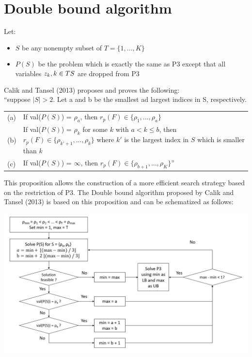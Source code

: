 \section{Double bound algorithm}

Let:
\begin{itemize}
	\item $S$ be any nonempty subset of $T = \lbrace 1, ..., K \rbrace$
	\item $P(S)$ be the problem which is exactly the same as P3 except that all variables $z_k, k \in T\\S$ are dropped from P3
\end{itemize}

Calik and Tansel (2013) proposes and proves the following:\\
``suppose $|S| > 2$. Let a and b be the smallest ad largest indices in S, respectively.\\
\begin{tabular}{l l}
(a) & If val($P(S)$) = $\rho_a$, then $r_p(F) \in \lbrace \rho_1, ..., \rho_a \rbrace$\\
(b) & If val($P(S)$) = $\rho_k$ for some $k$ with $a < k \leq b$, then $r_p(F) \in \lbrace \rho_{k'+1}, ..., \rho_k \rbrace$ where $k'$ is the largest index in $S$ which is smaller than $k$ \\
(c) & If val($P(S)$) = $\infty$, then $r_p(F) \in \lbrace \rho_{b+1}, ..., \rho_K \rbrace$''\\
\end{tabular}

This proposition allows the construction of a more efficient search strategy based on the restriction of P3. The Double bound algorithm proposed by Calik and Tansel (2013) is based on this proposition and can be schematized as follows:
\begin{center}
	\includegraphics[width=\textwidth]{../imgs/DB3.png}
\end{center}